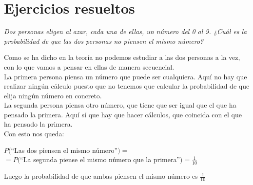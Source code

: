 \documentclass[a4paper,10pt,answers]{exam}
\begin{document}
\section{Ejercicios resueltos}
\begin{questions}
\question\emph{Dos personas eligen al azar, cada una de ellas, un número del 0 al 9. ¿Cuál es la
probabilidad de que las dos personas no piensen el mismo número?}
\begin{solution}
Como se ha dicho en la teoría no podemos estudiar a las dos personas a la vez, con lo que vamos a pensar en ellas de manera secuencial.\\
La primera persona piensa un número que puede ser cualquiera. Aquí no hay que realizar ningún cálculo puesto que no tenemos que calcular la probabilidad de que elija ningún número en concreto.\\
La segunda persona piensa otro número, que tiene que ser igual que el que ha pensado la primera. Aquí sí que hay que hacer cálculos, que coincida con el que ha pensado la primera.\\
Con esto nos queda:
\begin{center}
$P($``Las dos piensen el mismo número''$)=$\\$= P($``La segunda piense el mismo número que la primera''$) = \frac{1}{10}$
\end{center}
Luego la probabilidad de que ambas piensen el mismo número es $\frac{1}{10}$
\end{solution}


\end{questions}
\end{document}
